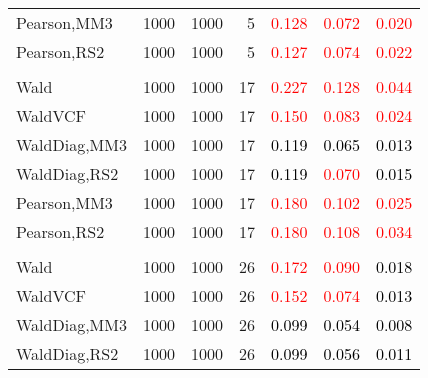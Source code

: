 \documentclass[
]{article}
\begin{document}
\begin{table}[H]
{\begin{tabular}[t]{lrrrrrr}
\hspace{1em}Pearson,MM3 & 1000 & 1000 & 5 & \textcolor{red}{0.128} & \textcolor{red}{0.072} & \textcolor{red}{0.020}\\
\hspace{1em}Pearson,RS2 & 1000 & 1000 & 5 & \textcolor{red}{0.127} & \textcolor{red}{0.074} & \textcolor{red}{0.022}\\
\addlinespace[0.3em]
\multicolumn{7}{l}{\textbf{1F 15V}}\\
\hspace{1em}Wald & 1000 & 1000 & 17 & \textcolor{red}{0.227} & \textcolor{red}{0.128} & \textcolor{red}{0.044}\\
\hspace{1em}WaldVCF & 1000 & 1000 & 17 & \textcolor{red}{0.150} & \textcolor{red}{0.083} & \textcolor{red}{0.024}\\
\hspace{1em}WaldDiag,MM3 & 1000 & 1000 & 17 & \textcolor{black}{0.119} & \textcolor{black}{0.065} & \textcolor{black}{0.013}\\
\hspace{1em}WaldDiag,RS2 & 1000 & 1000 & 17 & \textcolor{black}{0.119} & \textcolor{red}{0.070} & \textcolor{black}{0.015}\\
\hspace{1em}Pearson,MM3 & 1000 & 1000 & 17 & \textcolor{red}{0.180} & \textcolor{red}{0.102} & \textcolor{red}{0.025}\\
\hspace{1em}Pearson,RS2 & 1000 & 1000 & 17 & \textcolor{red}{0.180} & \textcolor{red}{0.108} & \textcolor{red}{0.034}\\
\addlinespace[0.3em]
\multicolumn{7}{l}{\textbf{2F 10V}}\\
\hspace{1em}Wald & 1000 & 1000 & 26 & \textcolor{red}{0.172} & \textcolor{red}{0.090} & \textcolor{black}{0.018}\\
\hspace{1em}WaldVCF & 1000 & 1000 & 26 & \textcolor{red}{0.152} & \textcolor{red}{0.074} & \textcolor{black}{0.013}\\
\hspace{1em}WaldDiag,MM3 & 1000 & 1000 & 26 & \textcolor{black}{0.099} & \textcolor{black}{0.054} & \textcolor{black}{0.008}\\
\hspace{1em}WaldDiag,RS2 & 1000 & 1000 & 26 & \textcolor{black}{0.099} & \textcolor{black}{0.056} & \textcolor{black}{0.011}\\

\end{tabular}}
\end{table}
\end{document}
